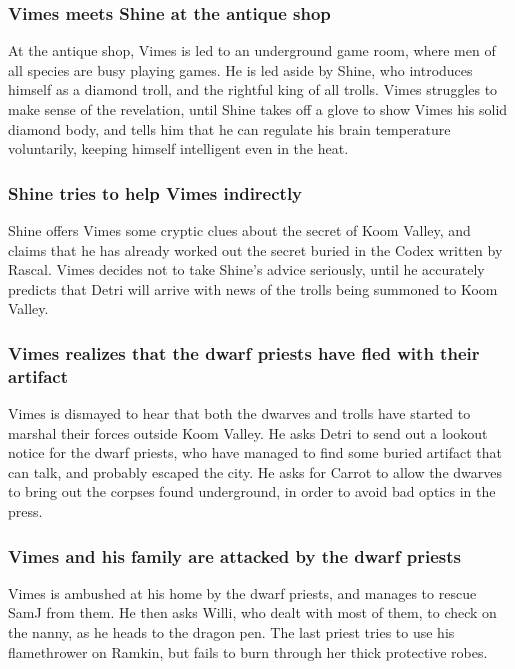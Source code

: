 \subsubsection{\Gls{Vimes} meets \Gls{Shine} at the antique shop}
At the antique shop, \Gls{Vimes} is led to an underground game room, where men of all species are
busy playing games. He is led aside by \Gls{Shine}, who introduces himself as a diamond troll, and
the rightful king of all trolls. \Gls{Vimes} struggles to make sense of the revelation, until
\Gls{Shine} takes off a glove to show \Gls{Vimes} his solid diamond body, and tells him that he can
regulate his brain temperature voluntarily, keeping himself intelligent even in the heat.

\subsubsection{\Gls{Shine} tries to help \Gls{Vimes} indirectly}
\Gls{Shine} offers \Gls{Vimes} some cryptic clues about the secret of Koom Valley, and claims that
he has already worked out the secret buried in the Codex written by \Gls{Rascal}. \Gls{Vimes}
decides not to take \Gls{Shine}'s advice seriously, until he accurately predicts that \Gls{Detri}
will arrive with news of the trolls being summoned to Koom Valley.

\subsubsection{\Gls{Vimes} realizes that the dwarf priests have fled with their artifact}
\Gls{Vimes} is dismayed to hear that both the dwarves and trolls have started to marshal their
forces outside Koom Valley. He asks \Gls{Detri} to send out a lookout notice for the dwarf priests,
who have managed to find some buried artifact that can talk, and probably escaped the city. He asks
for \Gls{Carrot} to allow the dwarves to bring out the corpses found underground, in order to avoid
bad optics in the press.

\subsubsection{\Gls{Vimes} and his family are attacked by the dwarf priests}
\Gls{Vimes} is ambushed at his home by the dwarf priests, and manages to rescue \Gls{SamJ} from
them. He then asks \Gls{Willi}, who dealt with most of them, to check on the nanny, as he heads to
the dragon pen. The last priest tries to use his flamethrower on \Gls{Ramkin}, but fails to burn
through her thick protective robes.

